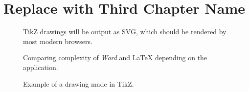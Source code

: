 \chapter{Replace with Third Chapter Name} \label{c3_thirdchapter:cha}

\begin{figure}
    \centering
    \caption{TikZ drawings will be output as SVG, which should be rendered by most modern browsers.}
\end{figure}

\begin{figure}
    \centering
    
    \caption{Comparing complexity of \textit{Word} and \LaTeX{} depending on the application.}
\end{figure}

\begin{figure}
    \centering
    

    \caption{Example of a drawing made in TikZ.}
\end{figure}

